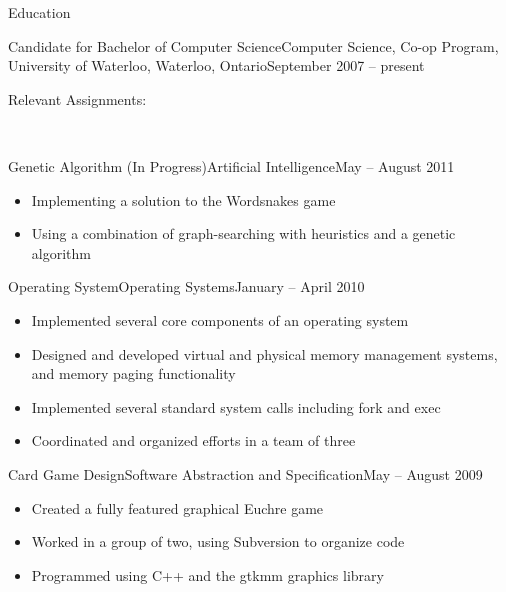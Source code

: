 \documentclass[11pt]{article}
\begin{document}
    \begin{section}{Education} \\

        \begin{subsection}{Candidate for Bachelor of Computer Science}{Computer Science, Co-op Program, University of Waterloo, Waterloo, Ontario}{September 2007 -- present}

            \begin{indent}
                \begin{bf}Relevant Assignments:\end{bf} \\
                \begin{subsection}{Genetic Algorithm (In Progress)}{Artificial Intelligence}{May -- August 2011}

                    \begin{itemize}
                        \item Implementing a solution to the Wordsnakes game
                        \item Using a combination of graph-searching with heuristics and a genetic algorithm
                    \end{itemize}

                \end{subsection}
                \begin{subsection}{Operating System}{Operating Systems}{January -- April 2010}

                    \begin{itemize}
                        \item Implemented several core components of an operating system
                        \item Designed and developed virtual and physical memory management systems, and memory paging functionality
                        \item Implemented several standard system calls including fork and exec
                        \item Coordinated and organized efforts in a team of three
                    \end{itemize}

                \end{subsection}
                \begin{subsection}{Card Game Design}{Software Abstraction and Specification}{May -- August 2009}

                    \begin{itemize}
                        \item Created a fully featured graphical Euchre game
                        \item Worked in a group of two, using Subversion to organize code
                        \item Programmed using C++ and the gtkmm graphics library
                    \end{itemize}


\end{subsection}
\end{indent}
\end{subsection}
\end{section}
\end{document}
